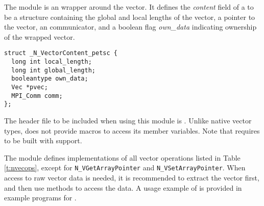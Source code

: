 %
The {\nvecpetsc} module is an {\nvector} wrapper around the {\petsc} vector.
It defines the {\em content} field of a  to be a structure containing
the global and local lengths of the vector, a pointer to the {\petsc} vector,
an {\mpi} communicator, and a boolean flag {\em own\_data} indicating ownership of 
the wrapped {\petsc} vector.
\begin{verbatim} 
struct _N_VectorContent_petsc {
  long int local_length;
  long int global_length;
  booleantype own_data;
  Vec *pvec;
  MPI_Comm comm;
};
\end{verbatim}

The header file to be included when using this module is .
Unlike native {\sundials} vector types, {\nvecpetsc} does not provide macros 
to access its member variables.
Note that {\nvecpetsc} requires {\sundials} to be built with {\mpi} support.


The {\nvecpetsc} module defines implementations of all vector operations listed 
in Table \ref{t:nvecops}, except for \verb|N_VGetArrayPointer| and 
\verb|N_VSetArrayPointer|. When access to raw vector data is needed, it is 
recommended to extract the {\petsc} vector first, and then use {\petsc} 
methods to access the data. A usage example of {\nvecpetsc} is provided in 
example programs for {\ida} \cite{ida_ex}.

